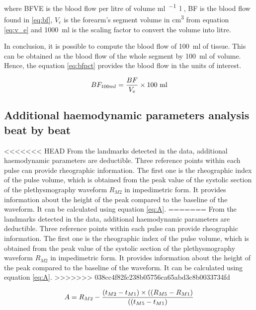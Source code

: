 where BFVE is the blood flow per litre of volume \si{\ml\per\min.\litre} , BF is the blood flow found in \ref{eq:bf}, $V_e$ is the forearm's segment volume in \si{\cubic\cm} from equation \ref{eq:v_e} and \SI{1000}{ml} is the scaling factor to convert the volume into litre.

In conclusion, it is possible to compute the blood flow of \SI{100}{\milli\litre} of tissue. This can be obtained as the blood flow of the whole segment by \SI{100}{\milli\litre} of volume. Hence, the equation \ref{eq:bfpct} provides the blood flow in the units of interest. 

\begin{align}
	\label{eq:bfpct}
	BF_{100ml} = \frac{BF}{V_e} \times \text{100 ml} \tagaddtext{[\si{\bfv}]}
\end{align}

\subsection{Additional haemodynamic parameters analysis beat by beat}
<<<<<<< HEAD
\label{section4.3.3}
From the landmarks  detected in the data, additional haemodynamic parameters are deductible. Three reference points within each pulse can provide rheographic information. The first one is the rheographic index of the pulse volume, which is obtained from the peak value of the systolic section of the plethysmography waveform $R_{M2}$ in impedimetric form. It provides information about the height of the peak compared to the baseline of the waveform. It can be calculated using equation \ref{eq:A}.
=======
\label{section procedure 3.3}
From the landmarks detected in the data, additional haemodynamic parameters are deductible. Three reference points within each pulse can provide rheographic information. The first one is the rheographic index of the pulse volume, which is obtained from the peak value of the systolic section of the plethysmography waveform $R_{M2}$ in impedimetric form. It provides information about the height of the peak compared to the baseline of the waveform. It can be calculated using equation \ref{eq:A}.
>>>>>>> 038cc4f82fc238b05756ca65abd3c8b0033734fd

\begin{align}
	\label{eq:A}
	A = R_{M2} - \frac{(t_{M2}-t_{M1}) \times ((R_{M5}-R_{M1})}{((t_{M5}-t_{M1})} \tagaddtext{[\si{\ohm}]}
\end{align}

